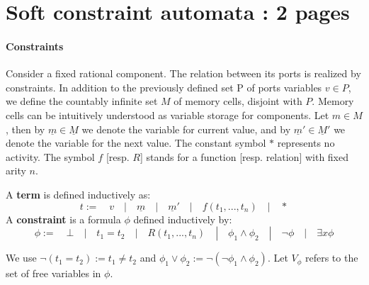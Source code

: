\section{Soft constraint automata : 2 pages}

\paragraph{Constraints}
Consider a fixed rational component. The relation between its ports is realized by constraints. In addition to the previously defined set P of ports variables $v\in P$, we define the countably infinite set $M$ of memory cells, disjoint with $P$. Memory cells can be intuitively understood as variable storage for components. Let $m \in M$, then by $\underline{m}\in \underline{M}$ we denote the variable for current value, and by $\underline{m}'\in \underline{M}'$ we denote the variable for the next value. The constant symbol $*$ represents no activity. The symbol $f$ [resp. $R$] stands for a function [resp. relation] with fixed arity $n$. 

\begin{definition} A \textbf{term} is defined inductively as:
	$$ t := \quad v \quad | \quad \underline{m} \quad | \quad \underline{m}' \quad | \quad f(t_1, ..., t_n) \quad | \quad * $$
	A \textbf{constraint} is a formula $\phi$ defined inductively by:
	$$ \phi := \quad \bot \quad |\quad t_1 = t_2 \quad|\quad R(t_1, ... , t_n) \quad|\quad \phi_1 \land \phi_2 \quad| \quad \neg \phi \quad| \quad \exists x \phi $$
\end{definition}

We use $\neg (t_1=t_2) := t_1 \not = t_2$ and $\phi_1 \lor \phi_2 := \neg (\neg \phi_1 \land \phi_2)$. Let $V_{\phi}$ refers to the set of free variables in $\phi$.

